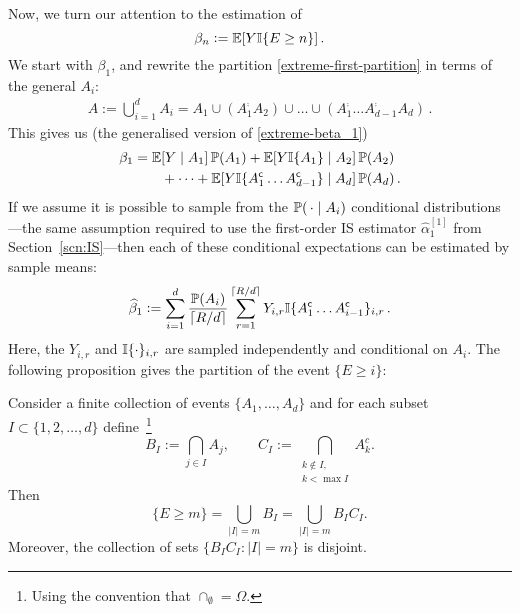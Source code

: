 Now, we turn our attention to the estimation of 
\[ \beta_n := \operatorname{{\mathbb E}}[ Y \mathbb I\{ E \ge n\} ] \,. \]
We start with $\beta_1$, and rewrite the partition \eqref{extreme-first-partition} in terms of the general $A_i$:
\begin{align} \label{first-partition}
A := \bigcup_{i=1}^d A_i = A_1 \cup (A_1^\comp A_2) \cup \dots \cup (A_1^\comp \dots A_{d-1}^\comp A_d ) \,.
\end{align}
This gives us (the generalised version of \eqref{extreme-beta_1})
\begin{align*}
  \beta_1 &= \operatorname{{\mathbb E}}[Y \mid A_1] \operatorname{{\mathbb P}}(A_1) + \operatorname{{\mathbb E}}[Y \mathbb I\{A_1\} \mid A_2] \operatorname{{\mathbb P}}(A_2) \\
  & \qquad + \dots + \operatorname{{\mathbb E}}[Y \mathbb I\{A_1^{\mathsf{c}} \dots A_{d-1}^{\mathsf{c}}\} \mid A_d] \operatorname{{\mathbb P}}(A_d) \,.
\end{align*}
If we assume it is possible to sample from the $\operatorname{{\mathbb P}}(\,\cdot \mid A_i)$ conditional distributions---the same assumption required to use the first-order IS estimator $\hat{\alpha}_{1}^{[1]}$ from Section~\ref{scn:IS}---then each of these conditional expectations can be estimated by sample means:
\begin{align} \label{est-beta_1}
	\widehat{\beta}_1 := \sum_{i=1}^d \frac{\operatorname{{\mathbb P}}(A_i)}{\lceil R/d \rceil} \sum_{r=1}^{\lceil R/d \rceil} 
	Y_{i,r} \mathbb I\{A_1^{\mathsf{c}} \dots A_{i-1}^{\mathsf{c}}\}_{i,r} \,.
\end{align}
Here, the $Y_{i,r}$ and $\mathbb I\{\cdot\}_{i,r}$ are sampled independently and conditional on $A_i$.
The following proposition gives the partition of the event $\{E \ge i\}$:

\begin{Proposition}\label{Prop.Partition}
 Consider a finite collection of events $\{A_1,\dots,A_d\}$ and for each subset 
 $I\subset\{1,2,\dots,d\}$ define~\footnote{Using the convention that $\cap_\emptyset=\Omega$.}
   \begin{equation*}
    B_I:=\bigcap_{j\in I} A_j,\qquad
    C_I:=\bigcap_{\substack{k\notin I,\\k<\max I}} A_k^c.
 \end{equation*}
 Then
 \begin{equation}\label{eq.partition}
  \{E\ge m\}=\bigcup_{|I|=m} B_I = \bigcup_{|I|=m} B_I C_I.
 \end{equation}
 Moreover, the collection of sets $\{B_IC_I:|I|=m\}$ is disjoint.
\end{Proposition}

